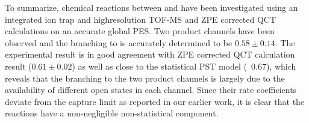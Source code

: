To summarize, chemical reactions between  and  have been investigated using an integrated ion trap and highresolution TOF-MS and ZPE corrected QCT calculations on an accurate global PES. Two product channels have been observed and the branching to  is accurately determined to be $0.58 \pm 0.14$. The experimental result is in good agreement with ZPE corrected QCT calculation result ($0.61 \pm 0.02$) as well as close to the statistical PST model (~0.67),\cite{Chen2019} which reveals that the branching to the two product channels is largely due to the availability of different open states in each channel. Since their rate coefficients deviate from the capture limit as reported in our earlier work, it is clear that the  reactions have a non-negligible non-statistical component.